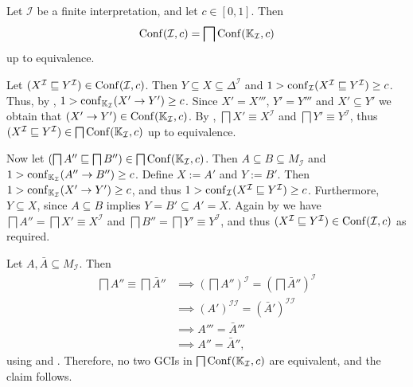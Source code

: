 \begin{Corollary}
  \label{cor:Conf-from-K_I}
  Let $\mathcal{I}$ be a finite interpretation, and let $c \in [0,1]$.  Then
  \begin{equation*}
    \operatorname{Conf}(\mathcal{I}, c) = \bigsqcap \operatorname{Conf}({\mathbb{K}}_{\mathcal{I}}, c)
  \end{equation*}
  up to equivalence.
\end{Corollary}
\begin{Proof}
  Let $(X^{\mathcal{I}} \sqsubseteq Y^{\mathcal{I}}) \in \operatorname{Conf}(\mathcal{I}, c)$.  Then $Y
  \subseteq X \subseteq \Delta^{\mathcal{I}}$ and $1 > \operatorname{conf}_{\mathcal{I}}(X^{\mathcal{I}}
  \sqsubseteq Y^{\mathcal{I}}) \ge c$.  Thus, by
  , $1 > \operatorname{conf}_{{\mathbb{K}}_{\mathcal{I}}}(X'
  \to Y') \ge c$.  Since $X' = X'''$, $Y' = Y'''$ and $X' \subseteq Y'$ we obtain that
  $(X' \to Y') \in \operatorname{Conf}({\mathbb{K}}_{\mathcal{I}}, c)$.  By
  , $\bigsqcap X' \equiv X^{\mathcal{I}}$ and
  $\bigsqcap Y' \equiv Y^{\mathcal{I}}$, thus $(X^{\mathcal{I}} \sqsubseteq
  Y^{\mathcal{I}}) \in \bigsqcap \operatorname{Conf}({\mathbb{K}}_{\mathcal{I}}, c)$ up to equivalence.

  Now let $(\bigsqcap A'' \sqsubseteq \bigsqcap B'') \in \bigsqcap \operatorname{Conf}({\mathbb{K}}_{\mathcal{I}}, c)$.  Then $A \subseteq B \subseteq M_{\mathcal{I}}$ and $1 >
  \operatorname{conf}_{{\mathbb{K}}_{\mathcal{I}}}(A'' \to B'') \ge c$.  Define $X := A'$ and $Y := B'$.  Then
  $1 > \operatorname{conf}_{{\mathbb{K}}_{\mathcal{I}}}(X' \to Y') \ge c$, and thus $1 >
  \operatorname{conf}_{\mathcal{I}}(X^{\mathcal{I}} \sqsubseteq Y^{\mathcal{I}}) \ge c$.  Furthermore,
  $Y \subseteq X$, since $A \subseteq B$ implies $Y = B' \subseteq A' = X$.  Again by
   we have $\bigsqcap A'' = \bigsqcap X' \equiv
  X^{\mathcal{I}}$ and $\bigsqcap B'' = \bigsqcap Y' \equiv Y^{\mathcal{I}}$, and thus
  $(X^{\mathcal{I}} \sqsubseteq Y^{\mathcal{I}}) \in \operatorname{Conf}(\mathcal{I}, c)$ as required.

  Let $A, \bar A \subseteq M_{\mathcal{I}}$.  Then
  \begin{align*}
    \bigsqcap A'' \equiv \bigsqcap \bar A''
    &\implies (\bigsqcap A'')^{\mathcal{I}} = (\bigsqcap \bar A'')^{\mathcal{I}} \\
    &\implies (A')^{\mathcal{I}\mathcal{I}} = (\bar A')^{\mathcal{I}\mathcal{I}} \\
    &\implies A''' = \bar A''' \\
    &\implies A'' = \bar A'',
  \end{align*}
  using  and .  Therefore,
  no two GCIs in $\bigsqcap \operatorname{Conf}({\mathbb{K}}_{\mathcal{I}}, c)$ are equivalent, and the claim
  follows.
\end{Proof}

